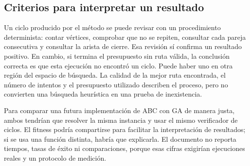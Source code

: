\subsection{Criterios para interpretar un resultado}
Un ciclo producido por el método se puede revisar con un procedimiento determinista: contar vértices, comprobar que no se repiten, consultar cada pareja consecutiva y consultar la arista de cierre. Esa revisión sí confirma un resultado positivo. En cambio, si termina el presupuesto sin ruta válida, la conclusión correcta es que esta ejecución no encontró un ciclo. Puede haber uno en otra región del espacio de búsqueda. La calidad de la mejor ruta encontrada, el número de intentos y el presupuesto utilizado describen el proceso, pero no convierten una búsqueda heurística en una prueba de inexistencia.

Para comparar una futura implementación de ABC con GA de manera justa, ambos tendrían que resolver la misma instancia y usar el mismo verificador de ciclos. El fitness podría compartirse para facilitar la interpretación de resultados; si se usa una función distinta, habría que explicarla. El documento no reporta tiempos, tasas de éxito ni comparaciones, porque esas cifras exigirían ejecuciones reales y un protocolo de medición.

